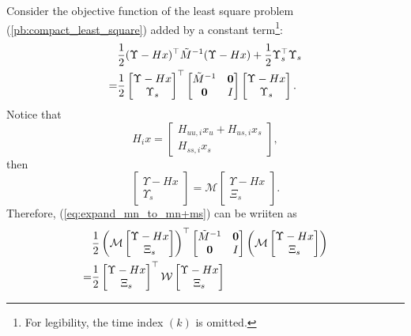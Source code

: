 \documentclass[journal]{IEEEtran}
\newcommand{\Mc}{{\mathcal{M}}}
\newcommand{\Wc}{{\mathcal{W}}}
\begin{document}
	Consider the objective function of the least square problem (\ref{pb:compact_least_square}) added by a constant term\footnote{For legibility, the time index $(k)$ is omitted.}:
	\begin{align}
		&\frac{1}{2} (\Upsilon - Hx )^{\top} \tilde{M}^{-1} (\Upsilon - Hx ) +\frac{1}{2}  \Upsilon_s^{\top} \Upsilon_s \notag \\
		=&\frac{1}{2}\begin{bmatrix}
			\Upsilon - Hx \\ \Upsilon_s
		\end{bmatrix}^{\top}
		\begin{bmatrix}
			\tilde{M}^{-1} & \mathbf{0} \\
			\mathbf{0} &  I
		\end{bmatrix}
		\begin{bmatrix}
			\Upsilon - Hx \\ \Upsilon_s
		\end{bmatrix}. \label{eq:expand_mn_to_mn+ms}
	\end{align}
	Notice that 
	\begin{equation*}
		H_i x =\begin{bmatrix}
			H_{uu,i} x_u + H_{us,i} x_s \\
			H_{ss,i} x_s
		\end{bmatrix},
	\end{equation*}
	then 
	\begin{equation*}
		\begin{bmatrix}
			\Upsilon - Hx \\
			\Upsilon_s
		\end{bmatrix}=\Mc
		\begin{bmatrix}
			\Upsilon - Hx \\
			\Xi_s
		\end{bmatrix}.
	\end{equation*}
	Therefore, (\ref{eq:expand_mn_to_mn+ms}) can be wriiten as 
	\begin{align}
		&\frac{1}{2}
		\left(\Mc
		\begin{bmatrix}
			\Upsilon - Hx \\
			\Xi_s
		\end{bmatrix}
		\right)^{\top}
		\begin{bmatrix}
			\tilde{M}^{-1} & \mathbf{0} \\
			\mathbf{0} &  I
		\end{bmatrix}
		\left(\Mc
		\begin{bmatrix}
			\Upsilon - Hx \\
			\Xi_s
		\end{bmatrix}
		\right) \notag
		\\
		=&\frac{1}{2}
		\begin{bmatrix}
			\Upsilon - Hx \\
			\Xi_s
		\end{bmatrix}^{\top}
		\Wc
		\begin{bmatrix}
			\Upsilon - Hx \\
			\Xi_s
		\end{bmatrix} \label{eq:obj_function}
	\end{align}
\end{document}
